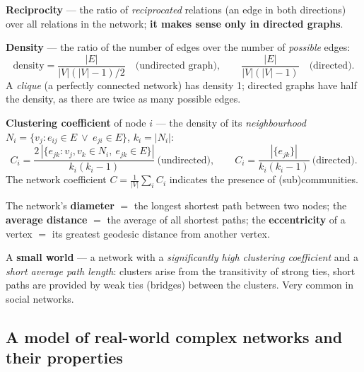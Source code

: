 \documentclass[11pt,a4paper]{article}
\theoremstyle{definition}
\begin{document}
\begin{defbox}
\textbf{Reciprocity} --- the ratio of \emph{reciprocated} relations (an edge in both
directions) over all relations in the network; \textbf{it makes sense only in directed
graphs}.

\textbf{Density} --- the ratio of the number of edges over the number of \emph{possible} edges:
\[ \text{density}=\frac{|E|}{|V|(|V|-1)/2}\quad\text{(undirected graph)},\qquad
   \frac{|E|}{|V|(|V|-1)}\quad\text{(directed)}. \]
A \emph{clique} (a perfectly connected network) has density 1; directed graphs have half the
density, as there are twice as many possible edges.

\textbf{Clustering coefficient} of node $i$ --- the density of its \emph{neighbourhood}
$N_i=\{v_j: e_{ij}\in E\ \vee\ e_{ji}\in E\}$, $k_i=|N_i|$:
\[ C_i=\frac{2\,|\{e_{jk}: v_j,v_k\in N_i,\ e_{jk}\in E\}|}{k_i(k_i-1)}
   \ \text{(undirected)},\qquad
   C_i=\frac{|\{e_{jk}\}|}{k_i(k_i-1)}\ \text{(directed)}. \]
The network coefficient $C=\frac{1}{|V|}\sum_i C_i$ indicates the presence of
(sub)communities.
\end{defbox}

\begin{defbox}
The network's \textbf{diameter} $=$ the longest shortest path between two nodes; the
\textbf{average distance} $=$ the average of all shortest paths; the \textbf{eccentricity}
of a vertex $=$ its greatest geodesic distance from another vertex.

A \textbf{small world} --- a network with a \emph{significantly high clustering coefficient}
and a \emph{short average path length}: clusters arise from the transitivity of strong ties,
short paths are provided by weak ties (bridges) between the clusters. Very common in social
networks.
\end{defbox}

\subsection{A model of real-world complex networks and their properties}
\end{document}
